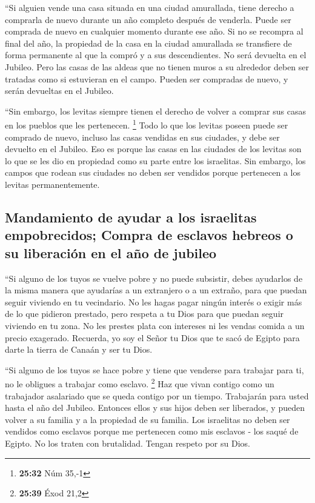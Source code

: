  ``Si alguien vende una casa situada en una ciudad
amurallada, tiene derecho a comprarla de nuevo durante un año completo
después de venderla. Puede ser comprada de nuevo en cualquier momento
durante ese año.  Si no se recompra al final del año, la
propiedad de la casa en la ciudad amurallada se transfiere de forma
permanente al que la compró y a sus descendientes. No será devuelta en
el Jubileo.  Pero las casas de las aldeas que no tienen
muros a su alrededor deben ser tratadas como si estuvieran en el campo.
Pueden ser compradas de nuevo, y serán devueltas en el Jubileo.

 ``Sin embargo, los levitas siempre tienen el derecho de
volver a comprar sus casas en los pueblos que les pertenecen.
\footnote{\textbf{25:32} Núm 35,-1}  Todo lo que los
levitas poseen puede ser comprado de nuevo, incluso las casas vendidas
en sus ciudades, y debe ser devuelto en el Jubileo. Eso es porque las
casas en las ciudades de los levitas son lo que se les dio en propiedad
como su parte entre los israelitas.  Sin embargo, los
campos que rodean sus ciudades no deben ser vendidos porque pertenecen a
los levitas permanentemente.

\hypertarget{mandamiento-de-ayudar-a-los-israelitas-empobrecidos-compra-de-esclavos-hebreos-o-su-liberaciuxf3n-en-el-auxf1o-de-jubileo}{%
\subsection{Mandamiento de ayudar a los israelitas empobrecidos; Compra
de esclavos hebreos o su liberación en el año de
jubileo}\label{mandamiento-de-ayudar-a-los-israelitas-empobrecidos-compra-de-esclavos-hebreos-o-su-liberaciuxf3n-en-el-auxf1o-de-jubileo}}

 ``Si alguno de los tuyos se vuelve pobre y no puede
subsistir, debes ayudarlos de la misma manera que ayudarías a un
extranjero o a un extraño, para que puedan seguir viviendo en tu
vecindario.  No les hagas pagar ningún interés o exigir
más de lo que pidieron prestado, pero respeta a tu Dios para que puedan
seguir viviendo en tu zona.  No les prestes plata con
intereses ni les vendas comida a un precio exagerado. 
Recuerda, yo soy el Señor tu Dios que te sacó de Egipto para darte la
tierra de Canaán y ser tu Dios.

 ``Si alguno de los tuyos se hace pobre y tiene que
venderse para trabajar para ti, no le obligues a trabajar como esclavo.
\footnote{\textbf{25:39} Éxod 21,2}  Haz que vivan
contigo como un trabajador asalariado que se queda contigo por un
tiempo. Trabajarán para usted hasta el año del Jubileo. 
Entonces ellos y sus hijos deben ser liberados, y pueden volver a su
familia y a la propiedad de su familia.  Los israelitas
no deben ser vendidos como esclavos porque me pertenecen como mis
esclavos - los saqué de Egipto.  No los traten con
brutalidad. Tengan respeto por su Dios.

